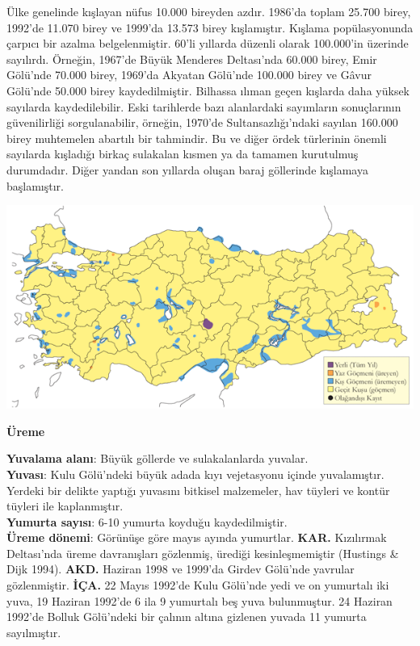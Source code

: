 \documentclass[
  letterpaper,
  DIV=11,
  numbers=noendperiod]{scrreprt}
\begin{document}
Ülke genelinde kışlayan nüfus 10.000 bireyden azdır. 1986'da toplam
25.700 birey, 1992'de 11.070 birey ve 1999'da 13.573 birey kışlamıştır.
Kışlama popülasyonunda çarpıcı bir azalma belgelenmiştir. 60'li yıllarda
düzenli olarak 100.000'in üzerinde sayılırdı. Örneğin, 1967'de Büyük
Menderes Deltası'nda 60.000 birey, Emir Gölü'nde 70.000 birey, 1969'da
Akyatan Gölü'nde 100.000 birey ve Gâvur Gölü'nde 50.000 birey
kaydedilmiştir. Bilhassa ılıman geçen kışlarda daha yüksek sayılarda
kaydedilebilir. Eski tarihlerde bazı alanlardaki sayımların sonuçlarının
güvenilirliği sorgulanabilir, örneğin, 1970'de Sultansazlığı'ndaki
sayılan 160.000 birey muhtemelen abartılı bir tahmindir. Bu ve diğer
ördek türlerinin önemli sayılarda kışladığı birkaç sulakalan kısmen ya
da tamamen kurutulmuş durumdadır. Diğer yandan son yıllarda oluşan baraj
göllerinde kışlamaya başlamıştır.

\includegraphics{images/harita_Page_018.png}

\textbf{Üreme}

\textbf{Yuvalama alanı}: Büyük göllerde ve sulakalanlarda yuvalar.\\
\textbf{Yuvası}: Kulu Gölü'ndeki büyük adada kıyı vejetasyonu içinde
yuvalamıştır. Yerdeki bir delikte yaptığı yuvasını bitkisel malzemeler,
hav tüyleri ve kontür tüyleri ile kaplanmıştır.\\
\textbf{Yumurta sayısı}: 6-10 yumurta koyduğu kaydedilmiştir.\\
\textbf{Üreme dönemi}: Görünüşe göre mayıs ayında yumurtlar.
\textbf{KAR.} Kızılırmak Deltası'nda üreme davranışları gözlenmiş,
ürediği kesinleşmemiştir (Hustings \& Dijk 1994). \textbf{AKD.} Haziran
1998 ve 1999'da Girdev Gölü'nde yavrular gözlenmiştir. \textbf{İÇA.} 22
Mayıs 1992'de Kulu Gölü'nde yedi ve on yumurtalı iki yuva, 19 Haziran
1992'de 6 ila 9 yumurtalı beş yuva bulunmuştur. 24 Haziran 1992'de
Bolluk Gölü'ndeki bir çalının altına gizlenen yuvada 11 yumurta
sayılmıştır.
\end{document}
